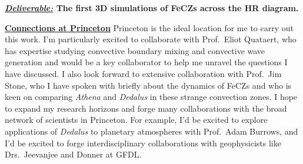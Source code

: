 \documentclass[12pt]{article}
\newcommand{\sct}[1]{\vspace{0.3cm}\hspace{-\parindent}\textbf{\underline{#1}}\hspace{0.3cm}}
\begin{document}
\textbf{\underline{\emph{Deliverable:}} The first 3D simulations of FeCZs across the HR diagram.}

\sct{Connections at Princeton}
Princeton is the ideal location for me to carry out this work.
I'm particularly excited to collaborate with Prof.~Eliot Quataert, who has expertise studying convective boundary mixing and convective wave generation and would be a key collaborator to help me unravel the questions I have discussed.
I also look forward to extensive collaboration with Prof.~Jim Stone, who I have spoken with briefly about the dynamics of FeCZs and who is keen on comparing \emph{Athena} and \emph{Dedalus} in these strange convection zones.
I hope to expand my research horizons and forge many collaborations with the broad network of scientists in Princeton.
For example, I'd be excited to explore applications of \emph{Dedalus} to planetary atmospheres with Prof.~Adam Burrows, and I'd be excited to forge interdisciplinary collaborations with geophysicists like Drs.~Jeevanjee and Donner at GFDL.

{\scriptsize

}
\end{document}
